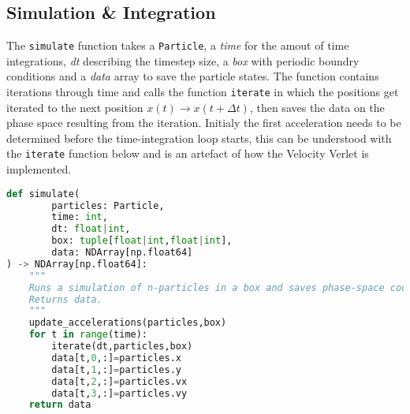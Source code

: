 \documentclass{article}
\begin{document}
\subsection{Simulation \& Integration}\label{SimulationAndIntegration}

The \texttt{simulate} function takes a \texttt{Particle}, a \textit{time} for the amout of time integrations, \textit{dt} describing the timestep size, a \textit{box} with periodic boundry conditions and a \textit{data} array to save the particle states. The function contains iterations through time and calls the function \texttt{iterate} in which the positions get iterated to the next position $x(t)\rightarrow x(t+\Delta t)$, then saves the data on the phase space resulting from the iteration. Initialy the first acceleration needs to be determined before the time-integration loop starts, this can be understood with the \texttt{iterate} function below and is an artefact of how the Velocity Verlet is implemented.

\begin{lstlisting}[language=Python, caption=Simulation]
def simulate(
        particles: Particle, 
        time: int,
        dt: float|int, 
        box: tuple[float|int,float|int],
        data: NDArray[np.float64]
) -> NDArray[np.float64]:
    """
    Runs a simulation of n-particles in a box and saves phase-space coordinates to data.\n
    Returns data.
    """
    update_accelerations(particles,box)
    for t in range(time):  
        iterate(dt,particles,box)
        data[t,0,:]=particles.x
        data[t,1,:]=particles.y
        data[t,2,:]=particles.vx
        data[t,3,:]=particles.vy
    return data
\end{lstlisting}
\end{document}

